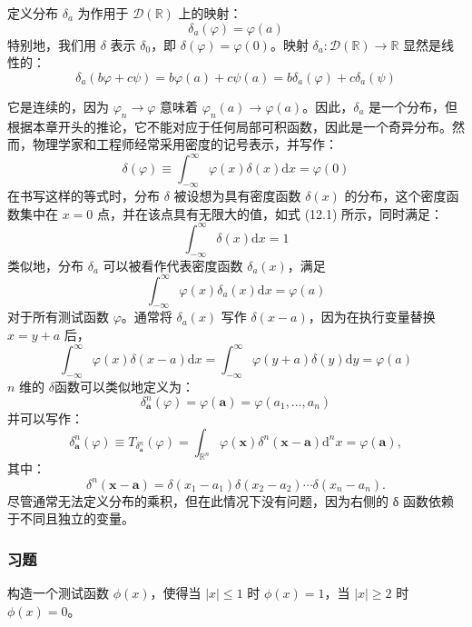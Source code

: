 \begin{eg}\label{eg:12.2}
定义分布 $\delta_a$ 为作用于 $\mathcal{D}(\mathbb{R})$ 上的映射：
 $$
\delta_a(\varphi) = \varphi(a)
$$
特别地，我们用 $\delta$ 表示 $\delta_0$，即
$\delta(\varphi) = \varphi(0)$。映射
$\delta_a: \mathcal{D}(\mathbb{R}) \to \mathbb{R}$ 显然是线性的：
\begin{equation}\label{eq:12.2}
  \delta_a(b \varphi + c \psi) = b \varphi(a) + c \psi(a) = b \delta_a(\varphi) + c \delta_a(\psi)
\end{equation}

它是连续的，因为 $\varphi_n \to \varphi$ 意味着
$\varphi_n(a) \to \varphi(a)$。因此，$\delta_a$
是一个分布，但根据本章开头的推论，它不能对应于任何局部可积函数，因此是一个奇异分布。然而，物理学家和工程师经常采用密度的记号表示，并写作：
 $$
\delta(\varphi) \equiv \int_{-\infty}^\infty \varphi(x) \delta(x) \mathrm{d}x = \varphi(0)
$$
在书写这样的等式时，分布 $\delta$ 被设想为具有密度函数 $\delta(x)$
的分布，这个密度函数集中在 $x = 0$ 点，并在该点具有无限大的值，如式
(12.1) 所示，同时满足：
 $$
\int_{-\infty}^\infty \delta(x) \mathrm{d}x = 1
$$
类似地，分布 $\delta_a$ 可以被看作代表密度函数 $\delta_a(x)$，满足
 $$
\int_{-\infty}^\infty \varphi(x) \delta_a(x) \mathrm{d}x = \varphi(a)
$$
对于所有测试函数 $\varphi$。通常将 $\delta_a(x)$ 写作
$\delta(x-a)$，因为在执行变量替换 $x = y + a$ 后，
 $$
\int_{-\infty}^\infty \varphi(x) \delta(x-a) \mathrm{d}x = \int_{-\infty}^\infty \varphi(y+a) \delta(y) \mathrm{d}y = \varphi(a)
$$
$n$ 维的 $\delta$函数可以类似地定义为：
 $$
\delta_\mathbf{a}^n(\varphi) = \varphi(\mathbf{a}) = \varphi(a_1, \ldots, a_n)
$$
并可以写作：
 $$
\delta_\mathbf{a}^n(\varphi) \equiv T_{\delta_\mathbf{a}^n}(\varphi) = \int_{\mathbb{R}^n} \varphi(\mathbf{x}) \delta^n(\mathbf{x} - \mathbf{a}) \mathrm{d}^n x = \varphi(\mathbf{a}),
$$
其中：
 $$
\delta^n(\mathbf{x} - \mathbf{a}) = \delta(x_1 - a_1) \delta(x_2 - a_2) \cdots \delta(x_n - a_n).
$$
尽管通常无法定义分布的乘积，但在此情况下没有问题，因为右侧的 δ
函数依赖于不同且独立的变量。
\end{eg}

\subsubsection{习题}
\begin{problem}\label{pro:12.1}
   构造一个测试函数 $\phi(x)$，使得当 $|x| \leq 1$ 时
$\phi(x) = 1$，当 $|x| \geq 2$ 时 $\phi(x) = 0$。
\end{problem}

